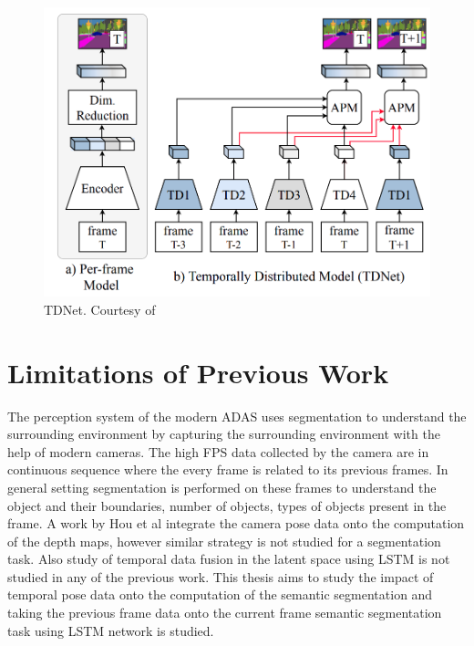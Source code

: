     \begin{figure}[h]
    	\centering
    	\includegraphics[width=12cm]{images/TDNet.png}
    	\caption{TDNet. Courtesy of \cite{78_hu2020temporally}}
    	\label{fig:TDNet}
    \end{figure}  
    
    \section{Limitations of Previous Work}
    
    The perception system of the modern ADAS uses segmentation to understand the surrounding environment by capturing the surrounding environment with the help of modern cameras. The high FPS data collected by the camera are in continuous sequence where the every frame is related to its previous frames. In general setting segmentation is performed on these frames to understand the object and their boundaries, number of objects, types of objects present in the frame. A work by Hou et al \cite{52_hou2019multi} integrate the camera pose data onto the computation of the depth maps, however similar strategy is not studied for a segmentation task. Also study of temporal data fusion in the latent space using LSTM is not studied in any of the previous work. This thesis aims to study the impact of temporal pose data onto the computation of the semantic segmentation and taking the previous frame data onto the current frame semantic segmentation task using LSTM network is studied. 
    


